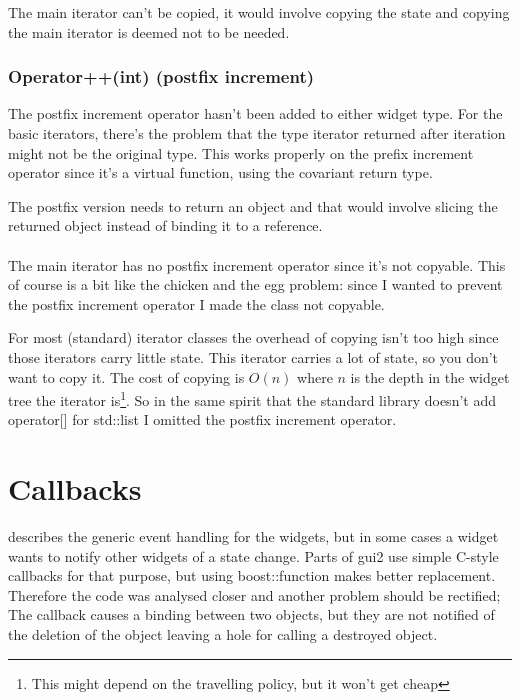 The main iterator can't be copied, it would involve copying the state
and copying the main iterator is deemed not to be needed.

\subsubsection{Operator++(int) (postfix increment)}

The postfix increment operator hasn't been added to either widget type. For the
basic iterators, there's the problem that the type iterator returned after
iteration might not be the original type. This works properly on the prefix
increment operator since it's a virtual function, using the covariant return
type.

The postfix version needs to return an object and that would involve slicing the
returned object instead of binding it to a reference.

\paragraph{}

The main iterator has no postfix increment operator since it's not copyable.
This of course is a bit like the chicken and the egg problem: since I wanted to
prevent the postfix increment operator I made the class not copyable.

For most (standard) iterator classes the overhead of copying isn't too high
since those iterators carry little state.  This iterator carries a lot of state,
so you don't want to copy it. The cost of copying is $O(n)$ where $n$ is the
depth in the widget tree the iterator is\footnote{This might depend on the
travelling policy, but it won't get cheap}. So in the same spirit that the
standard library doesn't add operator[] for std::list I omitted the postfix
increment operator.


\section{Callbacks}

 describes the generic event handling for the widgets, but
in some cases a widget wants to notify other widgets of a state change. Parts of
gui2 use simple C-style callbacks for that purpose, but using boost::function
makes better replacement. Therefore the code was analysed closer and another
problem should be rectified; The callback causes a binding between two objects,
but they are not notified of the deletion of the object leaving a hole for
calling a destroyed object.

